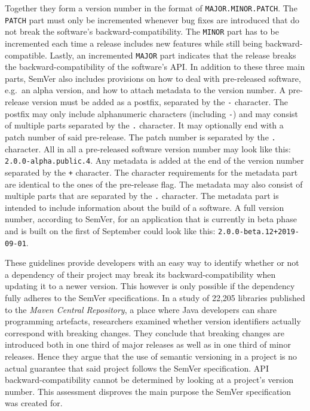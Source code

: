 Together they form a version number in the format of
\texttt{MAJOR.MINOR.PATCH}. The \texttt{PATCH} part must only be incremented
whenever bug fixes are introduced that do not break the software's
backward-compatibility. The \texttt{MINOR} part has to be incremented each
time a release includes new features while still being backward-compatible.
Lastly, an incremented \texttt{MAJOR} part indicates that the release breaks
the backward-compatibility of the software's \ac{API}. In addition to these
three main parts, SemVer also includes provisions on how to deal with
pre-released software, e.g.\ an alpha version, and how to attach metadata to
the version number. A pre-release version must be added as a postfix,
separated by the \texttt{-} character. The postfix may only include
alphanumeric characters (including \texttt{-}) and may consist of multiple
parts separated by the \texttt{.} character. It may optionally end with a patch
number of said pre-release. The patch number is separated by the \texttt{.}
character. All in all a pre-released software version number may look like
this: \texttt{2.0.0-alpha.public.4}. Any metadata is added at the end of the
version number separated by the \texttt{+} character. The character
requirements for the metadata part are identical to the ones of the pre-release
flag. The metadata may also consist of multiple parts that are separated by the
\texttt{.} character. The metadata part is intended to include information
about the build of a software. A full version number, according to SemVer, for
an application that is currently in beta phase and is built on the first of
September could look like this: \texttt{2.0.0-beta.12+2019-09-01}.

These guidelines provide developers with an easy way to identify whether or not
a dependency of their project may break its backward-compatibility when
updating it to a newer version. This however is only possible if the dependency
fully adheres to the SemVer specifications. In a study
\autocite{RaemaekersSemanticVersioningversus2014} of 22,205 libraries published
to the \textit{Maven Central Repository}, a place where Java developers can
share programming artefacts, researchers examined whether version identifiers
actually correspond with breaking changes. They conclude that breaking changes
are introduced both in one third of major releases as well as in one third of
minor releases. Hence they argue that the use of semantic versioning in a
project is no actual guarantee that said project follows the SemVer
specification. \ac{API} backward-compatibility cannot be determined by looking
at a project's version number. This assessment disproves the main purpose the
SemVer specification was created for.

